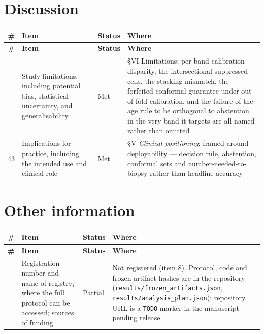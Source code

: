 \documentclass[10pt,a4paper]{article}
\begin{document}
\section*{Discussion}


\begin{longtable}{@{}rp{}lp{}@{}}
\toprule
\textbf{\#} & \textbf{Item} & \textbf{Status} & \textbf{Where} \\
\midrule
\endfirsthead
\toprule
\textbf{\#} & \textbf{Item} & \textbf{Status} & \textbf{Where} \\
\midrule
\endhead
\bottomrule
\endfoot
42 & Study limitations, including potential bias, statistical uncertainty, and generalisability & Met & \S{}VI Limitations; per-band calibration disparity, the intersectional suppressed cells, the stacking mismatch, the forfeited conformal guarantee under out-of-fold calibration, and the failure of the age rule to be orthogonal to abstention in the very band it targets are all named rather than omitted \\
43 & Implications for practice, including the intended use and clinical role & Met & \S{}V \emph{Clinical positioning}; framed around deployability --- decision rule, abstention, conformal sets and number-needed-to-biopsy rather than headline accuracy \\
\end{longtable}


\section*{Other information}


\begin{longtable}{@{}rp{}lp{}@{}}
\toprule
\textbf{\#} & \textbf{Item} & \textbf{Status} & \textbf{Where} \\
\midrule
\endfirsthead
\toprule
\textbf{\#} & \textbf{Item} & \textbf{Status} & \textbf{Where} \\
\midrule
\endhead
\bottomrule
\endfoot
44 & Registration number and name of registry; where the full protocol can be accessed; sources of funding & Partial & Not registered (item 8). Protocol, code and frozen artifact hashes are in the repository (\texttt{results/frozen\_artifacts.json}, \texttt{results/analysis\_plan.json}); repository URL is a \texttt{TODO} marker in the manuscript pending release \\
\end{longtable}
\end{document}
